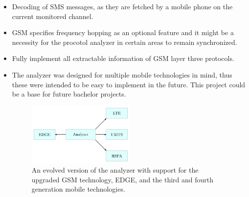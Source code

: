 \begin{itemize}
\item Decoding of \gls{SMS} messages, as they are fetched by a mobile
  phone on the current monitored channel.
\item \gls{GSM} specifies frequency hopping as an optional feature and
  it might be a necessity for the procotol analyzer in certain areas
  to remain synchronized.
\item Fully implement all extractable information of \gls{GSM} layer
  three protocols.
\item The analyzer was designed for multiple mobile technologies in
  mind, thus these were intended to be easy to implement in the
  future. This project could be a base for future bachelor projects.
\begin{figure}[H]
  \centering
  \includegraphics[width=0.5\textwidth]{figures/analyzer_interface_fw}
  \caption{An evolved version of the analyzer with support for
    the upgraded \gls{GSM} technology, EDGE, and the third and fourth
    generation mobile technologies.}
  \label{fig:analyzer_interface_fw}
\end{figure}
\end{itemize}
